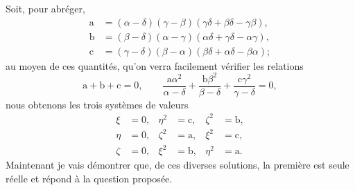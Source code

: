 \documentclass[11pt,leqno,oneside,letterpaper]{book}[2005/09/16]
\begin{document}
Soit, pour abr\'eger,
\begin{align*}
  \mathrm{a} &= (\alpha-\delta)(\gamma-\beta )
       (\gamma\delta + \beta \delta - \gamma\beta ),
\\
  \mathrm{b} &= (\beta -\delta)(\alpha-\gamma)
       (\alpha\delta + \gamma\delta - \alpha\gamma),
\\
  \mathrm{c} &= (\gamma-\delta)(\beta -\alpha)
       (\beta \delta + \alpha\delta - \beta \alpha);
\end{align*}
au moyen de ces quantit\'es, qu'on verra facilement v\'erifier les relations
\[
  \mathrm{a} + \mathrm{b} + \mathrm{c} = 0,  \qquad
  \frac{\mathrm{a}\alpha^2}{\alpha-\delta} +
  \frac{\mathrm{b} \beta^2}{\beta -\delta} +
  \frac{\mathrm{c}\gamma^2}{\gamma-\delta} = 0,
\]
nous obtenons les trois syst\`emes de valeurs
\begin{align*}
\tag*{\primo}
  \xi   &= 0, &  \eta^2 &= \mathrm{c}, & \zeta^2 &= \mathrm{b},
\\
\tag*{\secundo}
  \eta  &= 0, & \zeta^2 &= \mathrm{a}, &   \xi^2 &= \mathrm{c},
\\
\tag*{\tertio}
  \zeta &= 0, &   \xi^2 &= \mathrm{b}, &  \eta^2 &= \mathrm{a}.
\end{align*}
Maintenant je vais d\'emontrer que, de ces diverses solutions, la premi\`ere
est seule r\'eelle et r\'epond \`a la question propos\'ee.
\end{document}
